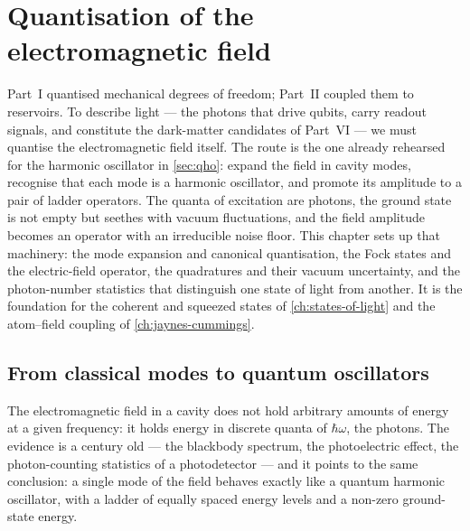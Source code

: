 \chapter{Quantisation of the electromagnetic field}
\label{ch:em-quantisation}

Part~I quantised mechanical degrees of freedom; Part~II coupled them
to reservoirs. To describe light --- the photons that drive qubits,
carry readout signals, and constitute the dark-matter candidates of
Part~VI --- we must quantise the electromagnetic field itself. The
route is the one already rehearsed for the harmonic oscillator in
\cref{sec:qho}: expand the field in cavity modes, recognise that
each mode is a harmonic oscillator, and promote its amplitude to a
pair of ladder operators. The quanta of excitation are photons, the
ground state is not empty but seethes with vacuum fluctuations, and
the field amplitude becomes an operator with an irreducible noise
floor. This chapter sets up that machinery: the mode expansion and
canonical quantisation, the Fock states and the electric-field
operator, the quadratures and their vacuum uncertainty, and the
photon-number statistics that distinguish one state of light from
another. It is the foundation for the coherent and squeezed states
of \cref{ch:states-of-light} and the atom--field coupling of
\cref{ch:jaynes-cummings}.

\section{From classical modes to quantum oscillators}
\label{sec:field-quantisation}

\begin{phenomenon}
The electromagnetic field in a cavity does not hold arbitrary
amounts of energy at a given frequency: it holds energy in discrete
quanta of $\hbar\omega$, the photons. The evidence is a century old
--- the blackbody spectrum, the photoelectric effect, the
photon-counting statistics of a photodetector --- and it points to
the same conclusion: a single mode of the field behaves exactly
like a quantum harmonic oscillator, with a ladder of equally spaced
energy levels and a non-zero ground-state energy.
\end{phenomenon}

